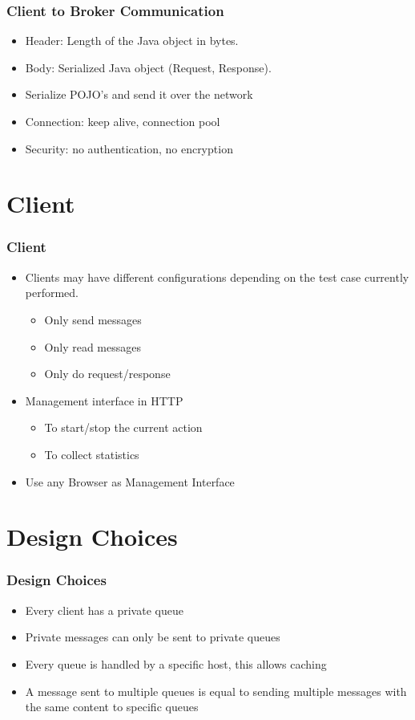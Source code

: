 \documentclass{beamer}
\begin{document}
\begin{frame}
\frametitle{Client to Broker Communication}

\begin{itemize}
\item Header: Length of the Java object in bytes.
\item Body: Serialized Java object (Request, Response).
\item Serialize POJO's and send it over the network
\item Connection: keep alive, connection pool
\item Security: no authentication, no encryption
\end{itemize}
\end{frame}



\section{Client}
\begin{frame}
\frametitle{Client}
\begin{itemize}
\item Clients may have different configurations depending on the test case currently performed.
\begin{itemize}
\item{Only send messages}
\item{Only read messages}
\item{Only do request/response}
\end{itemize}

\item Management interface in HTTP
\begin{itemize}
\item{To start/stop the current action}
\item{To collect statistics}
\end{itemize}
\item Use any Browser as Management Interface
\end{itemize}
\end{frame}


\section{Design Choices}
\begin{frame}
\frametitle{Design Choices}

\begin{itemize}
\item{Every client has a private queue}
\item{Private messages can only be sent to private queues}
\item{Every queue is handled by a specific host, this allows caching}
\item{A message sent to multiple queues is equal to sending multiple messages with the same content to specific queues}
\end{itemize}

\end{frame}
\end{document}
